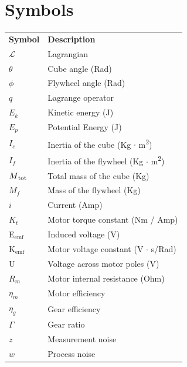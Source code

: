\documentclass[a4paper,11pt]{kth-mag}
\newcommand{\textunderscript}[1]{$_{\text{#1}}$}
\begin{document}
\section*{Symbols}
\noindent{}\begin{tabular}{@{}p{2.5cm}l}
\textbf{Symbol} 	& \textbf{Description} \vspace{.5em} \\
$\mathcal{L}$			& Lagrangian \\
$\theta$		& Cube angle (Rad)\\
$\phi$		& Flywheel angle (Rad) \\
$q$			& Lagrange operator \\
$E_k	$		& Kinetic energy (J)\\
$E_p$		& Potential Energy (J)\\
$I_c$		& Inertia of the cube (Kg $\cdot$ m\textsuperscript{2})\\
$I_f$		& Inertia of the flywheel (Kg $\cdot$ m\textsuperscript{2})\\
$M\textsubscript{tot}$		& Total mass of the cube (Kg)\\
$M_f$		& Mass of the flywheel (Kg)\\
$i$			& Current (Amp)\\
$K_t$		& Motor torque constant (Nm / Amp)\\
E\textunderscript{emf} 	& Induced voltage (V)\\
K\textunderscript{emf} 	& Motor voltage constant (V $\cdot$ s/Rad)\\
U			& Voltage across motor poles (V)\\
$R_m	$		& Motor internal resistance (Ohm)\\
$\eta_m$		& Motor efficiency\\	
$\eta_g$		& Gear efficiency \\
$\Gamma$		& Gear ratio\\
$z$			& Measurement noise \\
$w$			& Process noise \\

\end{tabular}
\clearpage
\end{document}
